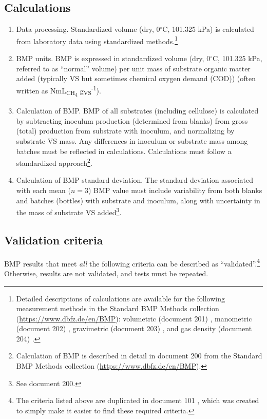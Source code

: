 \documentclass[]{article}
\begin{document}
\subsection{Calculations}
\label{sec:calculations}
\begin{enumerate}
  \item Data processing.
    Standardized  volume (dry, 0$^\circ$C, 101.325 kPa) is calculated from laboratory data using standardized methods.\footnote{
      Detailed descriptions of calculations are available for the following measurement methods in the Standard BMP Methods collection (\url{https://www.dbfz.de/en/BMP}): volumetric (document 201) \citep{BMPdoc201vol}, manometric (document 202) \citep{BMPdoc202man}, gravimetric (document 203) \citep{BMPdoc203grav}, and gas density (document 204) \citep{BMPdoc204gasdens}.
    }
  \item BMP units.
	  BMP is expressed in standardized  volume (dry, 0$^\circ$C, 101.325 kPa, referred to as ``normal'' volume) per unit mass of substrate organic matter added (typically VS but sometimes chemical oxygen demand (COD)) (often written as NmL\textsubscript{CH\textsubscript{4}} g\textsubscript{VS}\textsuperscript{-1}). 
  \item Calculation of BMP.
    BMP of all substrates (including cellulose) is calculated by subtracting inoculum  production (determined from blanks) from gross (total)  production from substrate with inoculum, and normalizing by substrate VS mass.
    Any differences in inoculum or substrate mass among batches must be reflected in calculations.
    Calculations must follow a standardized approach\footnote{
      Calculation of BMP is described in detail in document 200 from the Standard BMP Methods collection (\url{https://www.dbfz.de/en/BMP}).
    }.
  \item Calculation of BMP standard deviation.
    The standard deviation associated with each mean ($n = 3$) BMP value must include variability from both blanks and batches (bottles) with substrate and inoculum, along with uncertainty in the mass of substrate VS added\footnote{
      See document 200. 
    }.
\end{enumerate}

\subsection{Validation criteria}
\label{sec:crit}
BMP results that meet \textit{all} the following criteria can be described as ``validated''.\footnote{
The criteria listed above are duplicated in document 101 \citep{BMPdoc101val}, which was created to simply make it easier to find these required criteria.
}
Otherwise, results are not validated, and tests must be repeated.
\end{document}
